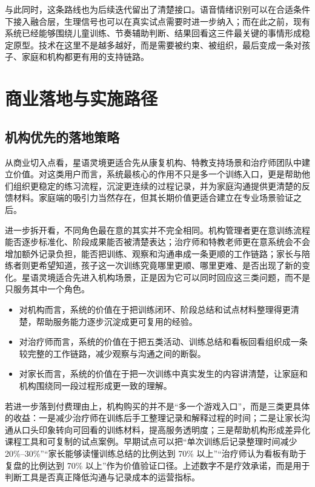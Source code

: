与此同时，这条路线也为后续迭代留出了清楚接口。语音情绪识别可以在合适条件下接入融合层，生理信号也可以在真实试点需要时进一步纳入；而在此之前，现有系统已经能够围绕儿童训练、节奏辅助判断、结果回看这三件最关键的事情形成稳定原型。技术在这里不是越多越好，而是需要被约束、被组织，最后变成一条对孩子、家庭和机构都更有用的支持链路。

\chapter{商业落地与实施路径}

\section{机构优先的落地策略}
从商业切入点看，星语灵境更适合先从康复机构、特教支持场景和治疗师团队中建立价值。对这类用户而言，系统最核心的作用不只是多一个训练入口，更是帮助他们组织更稳定的练习流程，沉淀更连续的过程记录，并为家庭沟通提供更清楚的反馈材料。家庭端的吸引力当然存在，但其长期价值更适合建立在专业场景验证之后。

进一步拆开看，不同角色最在意的其实并不完全相同。机构管理者更在意训练流程能否逐步标准化、阶段成果能否被清楚表达；治疗师和特教老师更在意系统会不会增加额外记录负担，能否把训练、观察和沟通串成一条更顺的工作链路；家长与陪练者则更希望知道，孩子这一次训练究竟哪里更顺、哪里更难、是否出现了新的变化。星语灵境适合先进入机构场景，正是因为它可以同时回应这三类问题，而不是只服务其中一个角色。

\begin{itemize}
  \item 对机构而言，系统的价值在于把训练闭环、阶段总结和试点材料整理得更清楚，帮助服务能力逐步沉淀成更可复用的经验。
  \item 对治疗师而言，系统的价值在于把五类活动、训练总结和看板回看组织成一条较完整的工作链路，减少观察与沟通之间的断裂。
  \item 对家长而言，系统的价值在于把一次训练中真实发生的内容讲清楚，让家庭和机构围绕同一段过程形成更一致的理解。
\end{itemize}

若进一步落到付费理由上，机构购买的并不是“多一个游戏入口”，而是三类更具体的收益：一是减少治疗师在训练后手工整理记录和解释过程的时间；二是让家长沟通从口头印象转向可回看的训练材料，提高服务透明度；三是帮助机构形成差异化课程工具和可复制的试点案例。早期试点可以把“单次训练后记录整理时间减少 20\%--30\%”“家长能够读懂训练总结的比例达到 70\% 以上”“治疗师认为看板有助于复盘的比例达到 70\% 以上”作为价值验证口径。上述数字不是疗效承诺，而是用于判断工具是否真正降低沟通与记录成本的运营指标。

